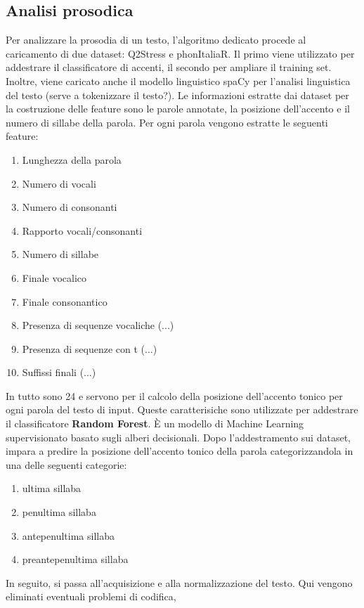\subsection{Analisi prosodica}
Per analizzare la prosodia di un testo, l'algoritmo dedicato procede al caricamento di due dataset: Q2Stress e phonItaliaR. Il primo viene utilizzato per addestrare il classificatore di accenti,
il secondo per ampliare il training set. Inoltre, viene caricato anche il modello linguistico spaCy per l'analisi linguistica del testo (serve a tokenizzare il testo?).
Le informazioni estratte dai dataset per la costruzione delle feature sono le parole annotate, la posizione dell'accento e il numero di sillabe della parola.
Per ogni parola vengono estratte le seguenti feature:
\begin{enumerate}
    \item Lunghezza della parola
    \item Numero di vocali
    \item Numero di consonanti
    \item Rapporto vocali/consonanti
    \item Numero di sillabe
    \item Finale vocalico
    \item Finale consonantico
    \item Presenza di sequenze vocaliche (...)
    \item Presenza di sequenze con t (...)
    \item Suffissi finali (...)
\end{enumerate} 
In tutto sono 24 e servono per il calcolo della posizione dell'accento tonico per ogni parola del testo di input. \newline
Queste caratterisiche sono utilizzate per addestrare il classificatore \textbf{Random Forest}. È un modello di Machine Learning 
supervisionato basato sugli alberi decisionali. Dopo l'addestramento sui dataset, impara a predire la posizione dell'accento tonico
della parola categorizzandola in una delle seguenti categorie:
\begin{enumerate}
    \item ultima sillaba
    \item penultima sillaba
    \item antepenultima sillaba
    \item preantepenultima sillaba
\end{enumerate}
In seguito, si passa all'acquisizione e alla normalizzazione del testo. Qui vengono eliminati eventuali problemi di codifica,
